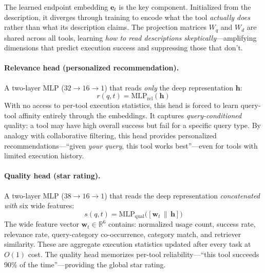 \documentclass{article}
\begin{document}
The learned endpoint embedding $\mathbf{e}_t$ is the key component. Initialized from the description, it diverges through training to encode what the tool \emph{actually does} rather than what its description claims. The projection matrices $W_q$ and $W_d$ are shared across all tools, learning \emph{how to read descriptions skeptically}---amplifying dimensions that predict execution success and suppressing those that don't.

\paragraph{Relevance head (personalized recommendation).} A two-layer MLP ($32 \to 16 \to 1$) that reads \emph{only} the deep representation $\mathbf{h}$:
%
\begin{equation}
  r(q, t) = \text{MLP}_{\text{rel}}(\mathbf{h})
\end{equation}
%
With no access to per-tool execution statistics, this head is forced to learn query-tool affinity entirely through the embeddings. It captures \emph{query-conditioned} quality: a tool may have high overall success but fail for a specific query type. By analogy with collaborative filtering, this head provides personalized recommendations---``given \emph{your query}, this tool works best''---even for tools with limited execution history.

\paragraph{Quality head (star rating).} A two-layer MLP ($38 \to 16 \to 1$) that reads the deep representation \emph{concatenated with} six wide features:
%
\begin{equation}
  s(q, t) = \text{MLP}_{\text{qual}}\bigl([\mathbf{w}_t \,\|\, \mathbf{h}]\bigr)
\end{equation}
%
The wide feature vector $\mathbf{w}_t \in \mathbb{R}^6$ contains: normalized usage count, success rate, relevance rate, query-category co-occurrence, category match, and retriever similarity. These are aggregate execution statistics updated after every task at $O(1)$ cost. The quality head memorizes per-tool reliability---``this tool succeeds 90\% of the time''---providing the global star rating.
\end{document}

